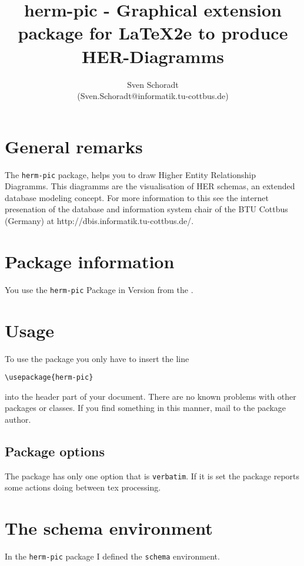 \documentclass[a4paper,11pt]{article}
\author{Sven Schoradt \\ (Sven.Schoradt@informatik.tu-cottbus.de)}
\title{herm-pic - Graphical extension package for LaTeX2e to produce HER-Diagramms}
\begin{document}
\maketitle

\section{General remarks}

The {\tt herm-pic} package, helps you to draw Higher Entity Relationship Diagramms.
This diagramms are the visualisation of HER schemas, an extended database modeling 
concept. For more information to this see the internet presenation of the
database and information system chair of the BTU Cottbus (Germany)
at http://dbis.informatik.tu-cottbus.de/.

\section{Package information}

You use the {\tt herm-pic} Package in Version \HERMpicRev{} from the \HERMpicDate.

\section{Usage}

To use the package you only have to insert the line

\begin{verbatim}
\usepackage{herm-pic}
\end{verbatim}

into the header part of your document. There are no known problems with other
packages or classes. If you find something in this manner, mail to the package 
author.

\subsection{Package options}

The package has only one option that is {\tt verbatim}. If it is set the package
reports some actions doing between tex processing.

\section{The schema environment}

In the {\tt herm-pic} package I defined the {\tt schema} environment.
\end{document}
